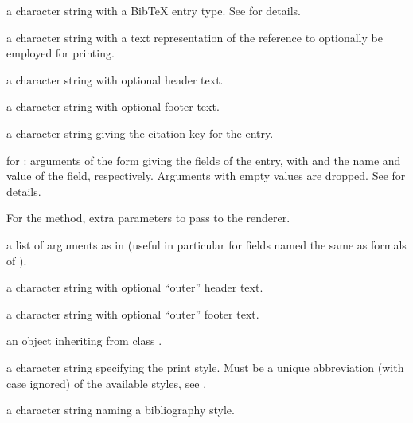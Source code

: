 %
\begin{Arguments}
\begin{ldescription}
\item[\code{bibtype}] a character string with a BibTeX entry type.
See  for details.

\item[\code{textVersion}] a character string with a text representation of
the reference to optionally be employed for printing.
\item[\code{header}] a character string with optional header text.
\item[\code{footer}] a character string with optional footer text.
\item[\code{key}] a character string giving the citation key for the entry.
\item[\code{...}] for : arguments of the form
 giving the fields of the entry, with
 and  the name and value of the field,
respectively.  Arguments with empty values are dropped.
See  for details.

For the  method, extra parameters to pass to the
renderer.
\item[\code{other}] a list of arguments as in  (useful in
particular for fields named the same as formals of
).
\item[\code{mheader}] a character string with optional ``outer'' header
text.
\item[\code{mfooter}] a character string with optional ``outer'' footer
text.
\item[\code{x}] an object inheriting from class .
\item[\code{style}] a character string specifying the print style.
Must be a unique abbreviation (with case ignored) of the available
styles, see .
\item[\code{.bibstyle}] a character string naming a bibliography style.
\end{ldescription}
\end{Arguments}
%
